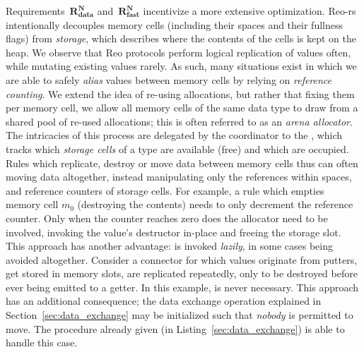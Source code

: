 Requirements~$\boldsymbol{R^N_{data}}$ and~$\boldsymbol{R^N_{fast}}$ incentivize a more extensive optimization. Reo-rs intentionally decouples memory cells (including their spaces and their fullness flags) from \textit{storage}, which describes where the contents of the cells is kept on the heap. We observe that Reo protocols perform logical replication of values often, while mutating existing values rarely. As such, many situations exist in which we are able to safely \textit{alias} values between memory cells by relying on \textit{reference counting}. We extend the idea of re-using allocations, but rather that fixing them per memory cell, we allow all memory cells of the same data type to draw from a shared pool of re-used allocations; this is often referred to as an \textit{arena allocator}. The intricacies of this process are delegated by the coordinator to the , which tracks which \textit{storage cells} of a type are available (free) and which are occupied. Rules which replicate, destroy or move data between memory cells thus can often moving data altogether, instead manipulating only the references within spaces, and reference counters of storage cells. For example, a rule which empties memory cell $m_0$ (destroying the contents) needs to only decrement the reference counter. Only when the counter reaches zero does the allocator need to be involved, invoking the value's destructor in-place and freeing the storage slot. This approach has another advantage:  is invoked \textit{lazily}, in some cases being avoided altogether. Consider a connector for which values originate from putters, get stored in memory slots, are replicated repeatedly, only to be destroyed before ever being emitted to a getter. In this example,  is never necessary. This approach has an additional consequence; the data exchange operation explained in Section~\ref{sec:data_exchange} may be initialized such that \textit{nobody} is permitted to move. The procedure already given (in Listing~\ref{sec:data_exchange}) is able to handle this case.



